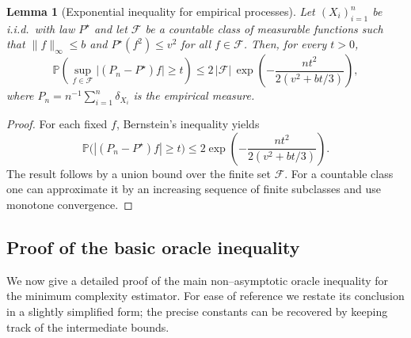 \documentclass[12pt]{article}
\newtheorem{lemma}[theorem]{Lemma}
\numberwithin{equation}{section}
\begin{document}
	\begin{lemma}[Exponential inequality for empirical processes]
		\label{lem:exp-ineq}
		Let $(X_i)_{i=1}^n$ be i.i.d.\ with law $P^{\star}$ and let $\mathcal{F}$
		be a countable class of measurable functions such that
		$\|f\|_{\infty} \le b$ and $P^{\star}(f^2)\le v^2$ for all $f\in\mathcal{F}$.
		Then, for every $t>0$,
		\begin{equation}
			\label{eq:bernstein}
			\mathbb{P}\!\left(
			\sup_{f\in\mathcal{F}}
			\big|(P_n-P^{\star})f\big|
			\ge t
			\right)
			\le 2\,|\mathcal{F}|\,
			\exp\!\left(
			-\frac{n t^2}{2(v^2 + b t/3)}
			\right),
		\end{equation}
		where $P_n = n^{-1}\sum_{i=1}^n \delta_{X_i}$ is the empirical measure.
	\end{lemma}
	
	\begin{proof}
		For each fixed $f$, Bernstein's inequality yields
		\[
		\mathbb{P}\big(|(P_n-P^{\star})f|\ge t\big)
		\le 2 \exp\!\left(
		-\frac{n t^2}{2(v^2 + b t/3)}
		\right).
		\]
		The result follows by a union bound over the finite set $\mathcal{F}$.
		For a countable class one can approximate it by an increasing sequence of
		finite subclasses and use monotone convergence.
	\end{proof}
	
	\subsection{Proof of the basic oracle inequality}
	
	We now give a detailed proof of the main non--asymptotic oracle inequality
	for the minimum complexity estimator.  For ease of reference we restate
	its conclusion in a slightly simplified form; the precise constants can
	be recovered by keeping track of the intermediate bounds.
	
\end{document}
